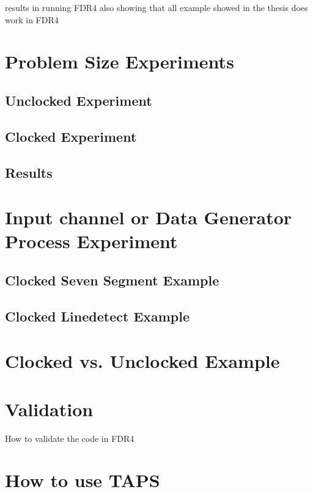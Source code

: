 results in running FDR4
also showing that all example showed in the thesis does work in FDR4

\section{Problem Size Experiments}

\subsection{Unclocked Experiment}

\subsection{Clocked Experiment}

\subsection{Results}





\section{Input channel or Data Generator Process Experiment}

\subsection{Clocked Seven Segment Example}

\subsection{Clocked Linedetect Example}





\section{Clocked vs. Unclocked Example}





\section{Validation}
    How to validate the code in FDR4

\section{How to use TAPS}
